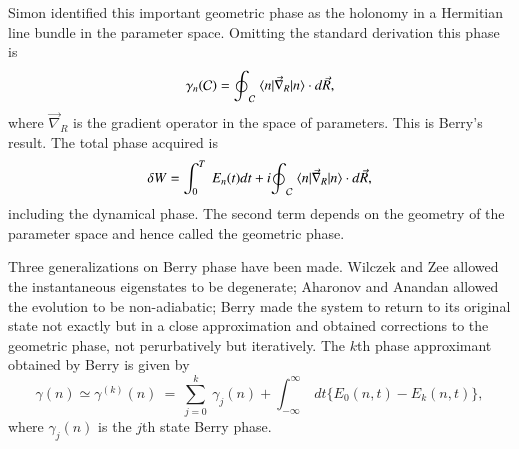 Simon \cite{chap11-key2} identified this important geometric phase as the holonomy in a Hermitian line bundle in the parameter space. Omitting the standard derivation this phase is  
\begin{equation}
{\gamma}_n({\cal{C}})= {\oint}_{\cal{C}}\ \langle n|{\vec{\nabla}}_R|n\rangle \cdot d\vec{R}, \label{chap11-eq1}
\end{equation}
where ${\vec{\nabla}}_R$ is the gradient operator in the space of parameters. This is Berry's result. The total phase 
acquired is 
\begin{equation}
\delta W= \int_0^T\ E_n(t)dt+i{\oint}_{\cal{C}}\ \langle n|{\vec{\nabla}}_R|n\rangle \cdot d\vec{R},\label{chap11-eq2}
\end{equation}
including the dynamical phase. The second term depends on the geometry of the parameter space and hence called the 
geometric phase.  

Three generalizations on Berry phase have been made. Wilczek and Zee \cite{chap11-key3} allowed the instantaneous eigenstates to be  degenerate; Aharonov and Anandan \cite{chap11-key4} allowed the evolution to be non-adiabatic; Berry \cite{chap11-key5} made the system to return  to its original state not exactly but in a close approximation and obtained corrections to the geometric phase,  not perurbatively but iteratively. The $k$th phase approximant obtained by Berry \cite{chap11-key5} is given by 
\begin{equation}
\gamma (n)\simeq{\gamma}^{(k)}(n)\ =\ \sum_{j=0}^k\ {\gamma}_j(n)+\int_{-\infty}^{\infty}\ dt\{E_0(n,t)- E_k(n,t)\}, \label{chap11-eq3}
\end{equation}
where ${\gamma}_j(n)$ is the $j$th state Berry phase.

